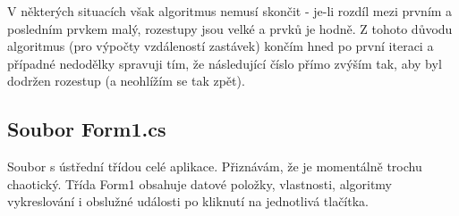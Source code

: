 \documentclass[14pt]{article}
\begin{document}
\begin{enumerate}
V některých situacích však algoritmus nemusí skončit - je-li rozdíl mezi prvním a posledním prvkem malý, rozestupy jsou velké a prvků je hodně. Z tohoto důvodu algoritmus (pro výpočty vzdáleností zastávek) končím hned po první iteraci a případné nedodělky spravuji tím, že následující číslo přímo zvýším tak, aby byl dodržen rozestup (a neohlížím se tak zpět).

\end{enumerate}

\subsection{Soubor Form1.cs}

Soubor s ústřední třídou celé aplikace. Přiznávám, že je momentálně trochu chaotický. Třída Form1 obsahuje datové položky, vlastnosti, algoritmy vykreslování i obslužné události po kliknutí na jednotlivá tlačítka.
\end{document}
